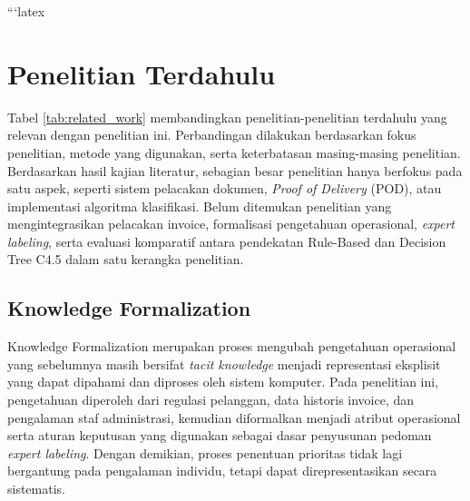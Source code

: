 ```latex
\section{Penelitian Terdahulu}

Tabel \ref{tab:related_work} membandingkan penelitian-penelitian terdahulu yang relevan dengan penelitian ini. Perbandingan dilakukan berdasarkan fokus penelitian, metode yang digunakan, serta keterbatasan masing-masing penelitian. Berdasarkan hasil kajian literatur, sebagian besar penelitian hanya berfokus pada satu aspek, seperti sistem pelacakan dokumen, \textit{Proof of Delivery} (POD), atau implementasi algoritma klasifikasi. Belum ditemukan penelitian yang mengintegrasikan pelacakan invoice, formalisasi pengetahuan operasional, \textit{expert labeling}, serta evaluasi komparatif antara pendekatan Rule-Based dan Decision Tree C4.5 dalam satu kerangka penelitian.

\begin{table}[htbp] \caption{Comparison of Previous Studies} \label{tab:related_work} \centering \renewcommand{\arraystretch}{1.15}  \end{table}

\subsection{Knowledge Formalization}

Knowledge Formalization merupakan proses mengubah pengetahuan operasional yang sebelumnya masih bersifat \textit{tacit knowledge} menjadi representasi eksplisit yang dapat dipahami dan diproses oleh sistem komputer. Pada penelitian ini, pengetahuan diperoleh dari regulasi pelanggan, data historis invoice, dan pengalaman staf administrasi, kemudian diformalkan menjadi atribut operasional serta aturan keputusan yang digunakan sebagai dasar penyusunan pedoman \textit{expert labeling}. Dengan demikian, proses penentuan prioritas tidak lagi bergantung pada pengalaman individu, tetapi dapat direpresentasikan secara sistematis.

